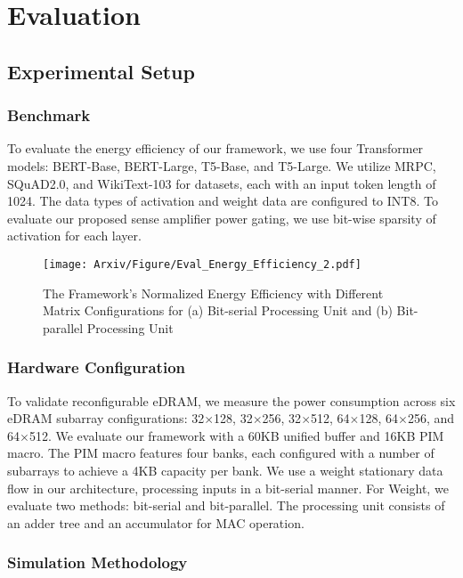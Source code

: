 



\section{Evaluation}
\label{evaluation}


\subsection{Experimental Setup}
\subsubsection{Benchmark}
To evaluate the energy efficiency of our \sysname framework, we use four Transformer models: BERT-Base, BERT-Large, T5-Base, and T5-Large. We utilize MRPC, SQuAD2.0, and WikiText-103 for datasets, each with an input token length of 1024. The data types of activation and weight data are configured to INT8. To evaluate our proposed sense amplifier power gating, we use bit-wise sparsity of activation for each layer.

\begin{figure}[t]
\centering
\texttt{[image: Arxiv/Figure/Eval\_Energy\_Efficiency\_2.pdf]}
\caption{The \sysname Framework’s Normalized Energy Efficiency with Different Matrix Configurations for (a) Bit-serial Processing Unit and (b) Bit-parallel Processing Unit}
\vspace{-0.1in}
\label{figure_energy_efficiency_2}
\end{figure}


\subsubsection{Hardware Configuration}
To validate reconfigurable eDRAM, we measure the power consumption across six eDRAM subarray configurations: 32$\times$128, 32$\times$256, 32$\times$512, 64$\times$128, 64$\times$256, and 64$\times$512. We evaluate our framework with a 60KB unified buffer and 16KB PIM macro. The PIM macro features four banks, each configured with a number of subarrays to achieve a 4KB capacity per bank. We use a weight stationary data flow in our architecture, processing inputs in a bit-serial manner. For Weight, we evaluate two methods: bit-serial and bit-parallel. The processing unit consists of an adder tree and an accumulator for MAC operation.

\subsubsection{Simulation Methodology}

